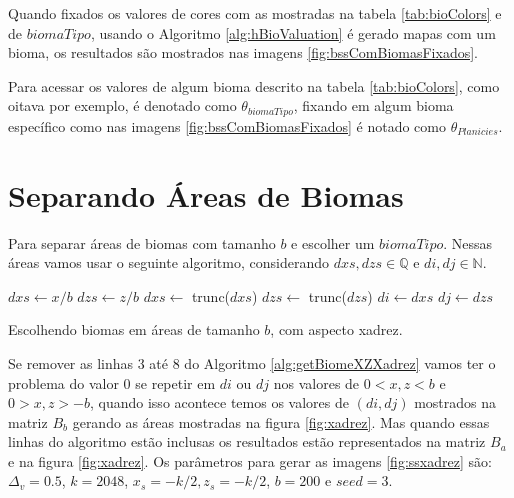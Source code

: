 Quando fixados os valores de cores com as mostradas
na tabela \ref{tab:bioColors} e de $biomaTipo$, usando o
Algoritmo \ref{alg:hBioValuation} é gerado mapas com um bioma,
os resultados são mostrados nas imagens \ref{fig:bssComBiomasFixados}.

Para acessar os valores de algum bioma descrito na tabela \ref{tab:bioColors}, como oitava por exemplo,
é denotado como $\theta_{biomaTipo}$, fixando em algum bioma específico como nas imagens \ref{fig:bssComBiomasFixados}
é notado como $\theta_{Planicies}$.

\section{Separando Áreas de Biomas}
Para separar áreas de biomas com tamanho $b$ e escolher um $biomaTipo$. Nessas áreas
vamos usar o seguinte algoritmo, considerando $dxs, dzs \in \mathbb{Q}$ e $di, dj \in \mathbb{N}$.

\begin{algorithm}[H]\label{alg:getBiomeXZXadrez}
    $dxs \leftarrow x/b$\;
    $dzs \leftarrow z/b$\;
    $dxs \leftarrow$ trunc($dxs$)\;
    $dzs \leftarrow$ trunc($dzs$)\;
    $di \leftarrow dxs$\;
    $dj \leftarrow dzs$\;
    
    
    \caption{Escolhendo biomas em áreas de tamanho $b$, com aspecto xadrez.}
\end{algorithm}

Se remover as linhas 3 até 8 do Algoritmo \ref{alg:getBiomeXZXadrez} vamos ter o 
problema do valor $0$ se repetir em $di$ ou $dj$ nos valores de $0 < x, z < b$ e $0 > x, z > -b$, 
quando isso acontece temos os valores de $(di, dj)$ mostrados na
matriz $B_{b}$ gerando as áreas mostradas na figura \ref{fig:xadrez}. Mas quando essas
linhas do algoritmo estão inclusas os resultados estão representados na matriz $B_{a}$
e na figura \ref{fig:xadrez}. Os parâmetros para gerar as
imagens \ref{fig:ssxadrez} são: $\Delta_{v} = 0.5$, 
$k = 2048$, $ x_{s} = -k/2 , z_{s} = -k/2$, $b = 200$ e $seed = 3$.

